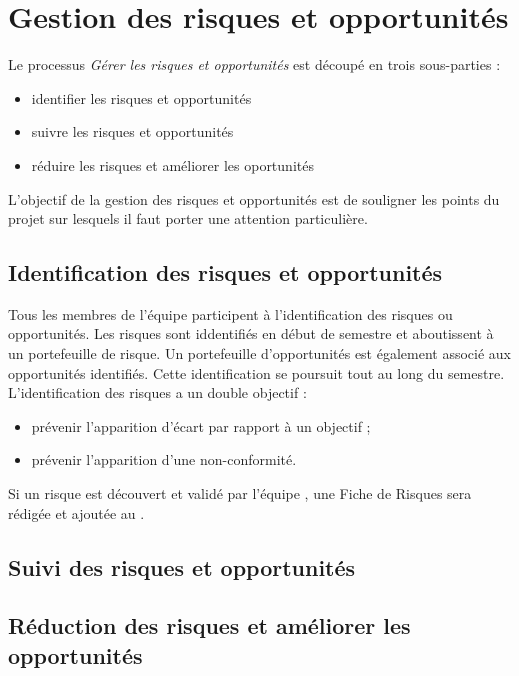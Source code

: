 \section{Gestion des risques et opportunités} 

Le processus \textit{Gérer les risques et opportunités} est découpé en trois sous-parties : 
\begin{itemize}
\item identifier les risques et opportunités
\item suivre les risques et opportunités
\item réduire les risques et améliorer les oportunités \\
\end{itemize}

L'objectif de la gestion des risques et opportunités est de souligner les points du projet sur lesquels il faut porter une attention particulière. 

\subsection{Identification des risques et opportunités}

Tous les membres de l'équipe participent à l'identification des risques ou opportunités. Les risques sont iddentifiés en début de semestre et aboutissent à un portefeuille de risque. Un portefeuille d'opportunités est également associé aux opportunités identifiés. Cette identification se poursuit tout au long du semestre. \\ 

L'identification des risques a un double objectif : 
\begin{itemize}
\item prévenir l'apparition d'écart par rapport à un objectif ;
\item prévenir l'apparition d'une non-conformité. \\
\end{itemize}
Si un risque est découvert et validé par l'équipe \PICCourt{}, une Fiche de Risques sera rédigée et ajoutée au \PR.\\



\subsection{Suivi des risques et opportunités}

\subsection{Réduction des risques et améliorer les opportunités}




